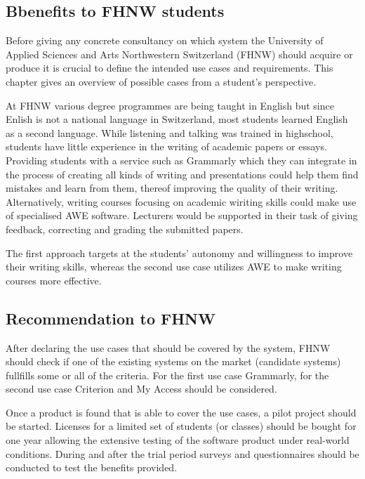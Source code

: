\documentclass[runningheads]{llncs}
\let\OldTextregistered\textregistered
\renewcommand{\textregistered}{\OldTextregistered\xspace}%
\begin{document}
\subsection{Bbenefits to FHNW students}
Before giving any concrete consultancy on which system the University of Applied Sciences and Arts Northwestern Switzerland (FHNW) should acquire or produce it is crucial to define the intended use cases and requirements. This chapter gives an overview of possible cases from a student's perspective.

At FHNW various degree programmes are being taught in English \citep{noauthor_university_nodate} but since Enlish is not a national language in Switzerland, most students learned English as a second language. While listening and talking was trained in highschool, students have little experience in the writing of academic papers or essays. Providing students with a service such as Grammarly\textregistered which they can integrate in the process of creating all kinds of writing and presentations could help them find mistakes and learn from them, thereof improving the quality of their writing. Alternatively, writing courses focusing on academic wiriting skills could make use of specialised AWE software. Lecturers would be supported in their task of giving feedback, correcting and grading the submitted papers.

The first approach targets at the students' autonomy and willingness to improve their writing skills, whereas the second use case utilizes AWE to make writing courses more effective. 

\subsection{Recommendation to FHNW}
After declaring the use cases that should be covered by the system, FHNW should check if one of the existing systems on the market (candidate systems) fullfills some or all of the criteria. For the first use case Grammarly\textregistered, for the second use case Criterion\textregistered and My Access should be considered. 

Once a product is found that is able to cover the use cases, a pilot project should be started. Licenses for a limited set of students (or classes) should be bought for one year allowing the extensive testing of the software product under real-world conditions. During and after the trial period surveys and questionnaires should be conducted to test the benefits provided. 
\end{document}
